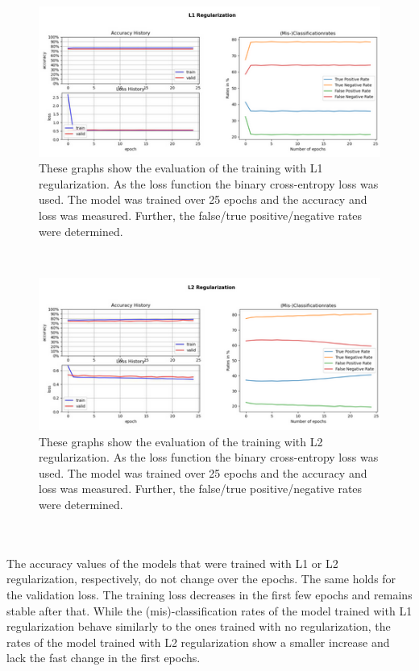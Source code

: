 \\
\begin{figure}[h]
	\centering
	\includegraphics[scale=0.8]{Figures/chapter04/multi_reg1}
	\decoRule
	\caption[L1 Regularization]{These graphs show the evaluation of the training with L1 regularization. As the loss function the binary cross-entropy loss was used. The model was trained over 25 epochs and the accuracy and loss was measured. Further, the false/true positive/negative rates were determined.}
	\label{fig:MultilabelL1Regularization}
\end{figure}
\\
\begin{figure}[h]
	\centering
	\includegraphics[scale=0.8]{Figures/chapter04/multi_reg2}
	\decoRule
	\caption[L2 Regularization]{These graphs show the evaluation of the training with L2 regularization. As the loss function the binary cross-entropy loss was used. The model was trained over 25 epochs and the accuracy and loss was measured. Further, the false/true positive/negative rates were determined.}
	\label{fig:MultilabelL2Regularization}
\end{figure}
\\
\\
The accuracy values of the models that were trained with L1 or L2 regularization, respectively, do not change over the epochs. The same holds for the validation loss. The training loss decreases in the first few epochs and remains stable after that.
While the (mis)-classification rates of the model trained with L1 regularization behave similarly to the ones trained with no regularization, the rates of the model trained with L2 regularization show a smaller increase and lack the fast change in the first epochs. \\
